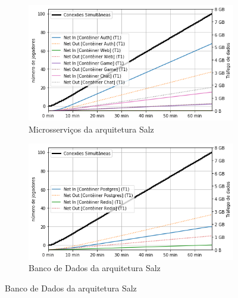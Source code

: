 \begin{figure}[htb!]
    \begin{subfigure}{.5\textwidth}
        \centering
        \includegraphics[width=.95\linewidth]{figuras/testes/s_net_game.png}
        \caption{Microsserviços da arquitetura Salz}
        \label{fig:s_net_game}
    \end{subfigure}%
    \begin{subfigure}{.5\textwidth}
        \centering
        \includegraphics[width=.95\linewidth]{figuras/testes/s_net_db.png}
        \caption{Banco de Dados da arquitetura Salz}
        \label{fig:s_net_db}
    \end{subfigure}%
    

\end{figure}
